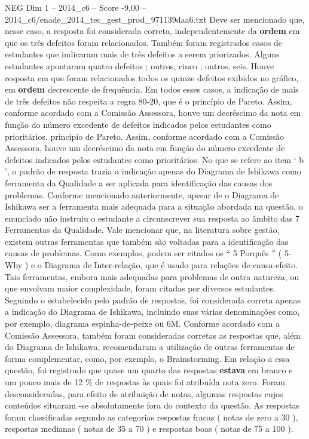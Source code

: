 \begin{textsample}{NEG Dim 1 – 2014\_c6 – Score -9.00 – 2014\_c6/enade\_2014\_tec\_gest\_prod\_971139daa6.txt}
Deve ser mencionado que, nesse caso, a resposta foi considerada correta, independentemente da \textbf{ordem} em que os três defeitos foram relacionados.
Também foram registrados casos de estudantes que indicaram mais de três defeitos a serem priorizados.
Alguns estudantes apontaram quatro defeitos ; outros, cinco ; outros, seis.
Houve resposta em que foram relacionados todos os quinze defeitos exibidos no gráfico, em \textbf{ordem} decrescente de frequência.
Em todos esses casos, a indicação de mais de três defeitos não respeita a regra 80-20, que é o princípio de Pareto.
Assim, conforme acordado com a Comissão Assessora, houve um decréscimo da nota em função do número excedente de defeitos indicados pelos estudantes como prioritários. princípio de Pareto.
Assim, conforme acordado com a Comissão Assessora, houve um decréscimo da nota em função do número excedente de defeitos indicados pelos estudantes como prioritários.
No que se refere ao item ‘ b ’, o padrão de resposta trazia a indicação apenas do Diagrama de Ishikawa como ferramenta da Qualidade a ser aplicada para identificação das causas dos problemas.
Conforme mencionado anteriormente, apesar de o Diagrama de Ishikawa ser a ferramenta mais adequada para a situação abordada na questão, o enunciado não instruiu o estudante a circunscrever sua resposta ao âmbito das 7 Ferramentas da Qualidade.
Vale mencionar que, na literatura sobre gestão, existem outras ferramentas que também são voltadas para a identificação das causas de problemas.
Como exemplos, podem ser citados os “ 5 Porquês ” ( 5-Why ) e o Diagrama de Inter-relação, que é usado para relações de causa-efeito.
Tais ferramentas, embora mais adequadas para problemas de outra natureza, ou que envolvam maior complexidade, foram citadas por diversos estudantes.
Seguindo o estabelecido pelo padrão de respostas, foi considerada correta apenas a indicação do Diagrama de Ishikawa, incluindo suas várias denominações como, por exemplo, diagrama espinha-de-peixe ou 6M.
Conforme acordado com a Comissão Assessora, também foram consideradas corretas as respostas que, além do Diagrama de Ishikawa, recomendaram a utilização de outras ferramentas de forma complementar, como, por exemplo, o Brainstorming.
Em relação a essa questão, foi registrado que quase um quarto das respostas \textbf{estava} em branco e um pouco mais de 12 \% de respostas às quais foi atribuída nota zero.
Foram desconsideradas, para efeito de atribuição de notas, algumas respostas cujos conteúdos situaram -se absolutamente fora do contexto da questão.
As respostas foram classificadas segundo as categorias respostas fracas ( notas de zero a 30 ), respostas medianas ( notas de 35 a 70 ) e respostas boas ( notas de 75 a 100 ).

\end{textsample}
